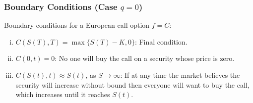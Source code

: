 \subsubsection{Boundary Conditions (Case $q = 0$)}
Boundary conditions for a European call option \(f = C\):
\begin{enumerate}[i.]
    \item \(C(S(T),T) = \max\{S(T) - K, 0\}\): Final condition.
    \item \(C(0, t) = 0\): No one will buy the call on a security whose price is zero.
    \item \(C(S(t),t) \approx S(t)\), as \(S \to \infty\): If at any time the market believes the security will increase without bound then everyone will want to buy the call, which increases until it reaches \(S(t)\).
\end{enumerate}

